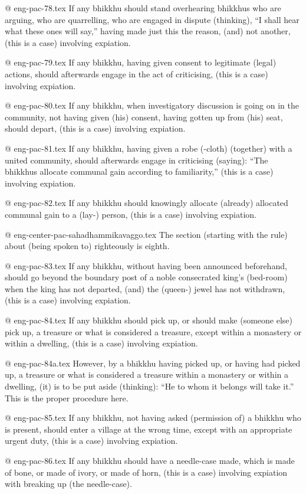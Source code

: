 @ eng-pac-78.tex
If any bhikkhu should stand overhearing bhikkhus who are arguing, who are quarrelling, who are engaged in dispute (thinking), “I shall hear what these ones will say,” having made just this the reason, (and) not another, (this is a case) involving expiation.

@ eng-pac-79.tex
If any bhikkhu, having given consent to legitimate (legal) actions, should afterwards engage in the act of criticising, (this is a case) involving expiation.

@ eng-pac-80.tex
If any bhikkhu, when investigatory discussion is going on in the community, not having given (his) consent, having gotten up from (his) seat, should depart, (this is a case) involving expiation.

@ eng-pac-81.tex
If any bhikkhu, having given a robe (-cloth) (together) with a united community, should afterwards engage in criticising (saying): “The bhikkhus allocate communal gain according to familiarity,” (this is a case) involving expiation.

@ eng-pac-82.tex
If any bhikkhu should knowingly allocate (already) allocated communal gain to a (lay-) person, (this is a case) involving expiation.

@ eng-center-pac-sahadhammikavaggo.tex
The section (starting with the rule) about (being spoken to) righteously is eighth.

@ eng-pac-83.tex
If any bhikkhu, without having been announced beforehand, should go beyond the boundary post of a noble consecrated king's (bed-room) when the king has not departed, (and) the (queen-) jewel has not withdrawn, (this is a case) involving expiation.

@ eng-pac-84.tex
If any bhikkhu should pick up, or should make (someone else) pick up, a treasure or what is considered a treasure, except within a monastery or within a dwelling, (this is a case) involving expiation.

@ eng-pac-84a.tex
However, by a bhikkhu having picked up, or having had picked up, a treasure or what is considered a treasure within a monastery or within a dwelling, (it) is to be put aside (thinking): “He to whom it belongs will take it.” This is the proper procedure here.

@ eng-pac-85.tex
If any bhikkhu, not having asked (permission of) a bhikkhu who is present, should enter a village at the wrong time, except with an appropriate urgent duty, (this is a case) involving expiation.

@ eng-pac-86.tex
If any bhikkhu should have a needle-case made, which is made of bone, or made of ivory, or made of horn, (this is a case) involving expiation with breaking up (the needle-case).

